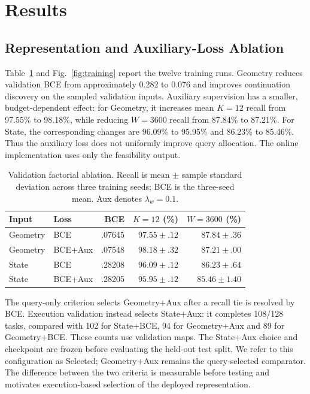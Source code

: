 \documentclass[journal]{IEEEtran}
\begin{document}
\section{Results}
\subsection{Representation and Auxiliary-Loss Ablation}
Table~\ref{tab:factorial} and Fig.~\ref{fig:training} report the twelve training runs. Geometry reduces validation BCE from approximately 0.282 to 0.076 and improves continuation discovery on the sampled validation inputs. Auxiliary supervision has a smaller, budget-dependent effect: for Geometry, it increases mean $K=12$ recall from 97.55\% to 98.18\%, while reducing $W=3600$ recall from 87.84\% to 87.21\%. For State, the corresponding changes are 96.09\% to 95.95\% and 86.23\% to 85.46\%. Thus the auxiliary loss does not uniformly improve query allocation. The online implementation uses only the feasibility output.

\begin{table}[!t]
\centering\scriptsize
\caption{Validation factorial ablation. Recall is mean $\pm$ sample standard deviation across three training seeds; BCE is the three-seed mean. Aux denotes $\lambda_w=0.1$.}
\label{tab:factorial}
\begin{tabular}{llrrr}
\toprule
Input & Loss & BCE & $K=12$ (\%) & $W=3600$ (\%)\\
\midrule
Geometry & BCE & .07645 & $97.55\pm.12$ & $87.84\pm.36$\\
Geometry & BCE+Aux & .07548 & $98.18\pm.32$ & $87.21\pm.00$\\
State & BCE & .28208 & $96.09\pm.12$ & $86.23\pm.64$\\
State & BCE+Aux & .28205 & $95.95\pm.12$ & $85.46\pm1.40$\\
\bottomrule
\end{tabular}
\end{table}

The query-only criterion selects Geometry+Aux after a recall tie is resolved by BCE. Execution validation instead selects State+Aux: it completes 108/128 tasks, compared with 102 for State+BCE, 94 for Geometry+Aux and 89 for Geometry+BCE. These counts use validation maps. The State+Aux choice and checkpoint are frozen before evaluating the held-out test split. We refer to this configuration as Selected; Geometry+Aux remains the query-selected comparator. The difference between the two criteria is measurable before testing and motivates execution-based selection of the deployed representation.
\end{document}
